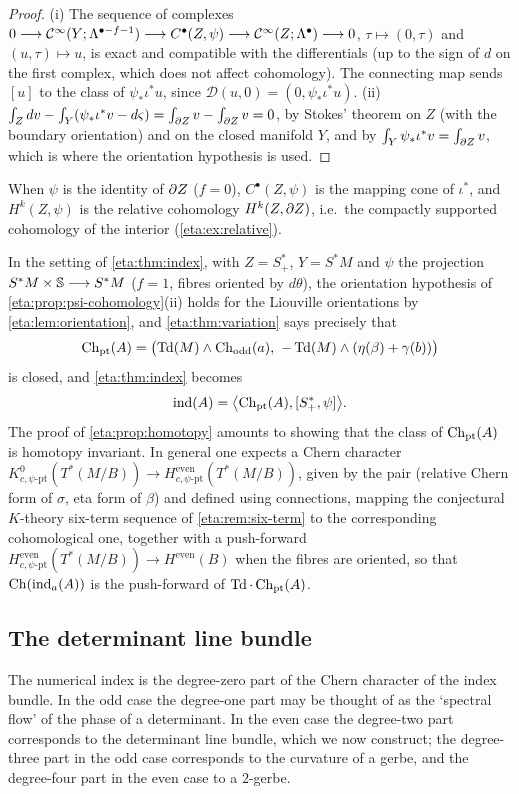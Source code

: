 \begin{proof} (i) The sequence of complexes $0\longrightarrow\mathcal{C}^\infty(Y;\Lambda^{\bullet-f-1})
\longrightarrow C^\bullet(Z,\psi)\longrightarrow\mathcal{C}^\infty(Z;\Lambda^\bullet)\longrightarrow0$,
$\tau\mapsto(0,\tau)$ and $(u,\tau)\mapsto u$, is exact and compatible with the
differentials (up to the sign of $d$ on the first complex, which does not affect
cohomology). The connecting map sends $[u]$ to the class of $\psi_*\iota^*u$, since
$\mathcal D(u,0)=(0,\psi_*\iota^*u)$. (ii) $\int_Zdv-\int_Y(\psi_*\iota^*v-d\varsigma)=
\int_{\partial Z}v-\int_{\partial Z}v=0$, by Stokes' theorem on $Z$ (with the boundary
orientation) and on the closed manifold $Y$, and by $\int_Y\psi_*\iota^*v=\int_{\partial Z}v$,
which is where the orientation hypothesis is used.
\end{proof}

When $\psi$ is the identity of $\partial Z$ ($f=0$), $C^\bullet(Z,\psi)$ is the mapping cone of
$\iota^*$, and $H^k(Z,\psi)$ is the relative cohomology $H^k(Z,\partial Z)$, i.e.\ the
compactly supported cohomology of the interior (\cref{eta:ex:relative}).

In the setting of \cref{eta:thm:index}, with $Z=S^*_+$, $Y=S^*M$ and $\psi$ the projection
$S^*M\times\mathbb{S}\longrightarrow S^*M$ ($f=1$, fibres oriented by $d\theta$), the
orientation hypothesis of \cref{eta:prop:psi-cohomology}(ii) holds for the Liouville
orientations by \cref{eta:lem:orientation}, and \cref{eta:thm:variation} says precisely that
\[
\Ch_{\mathrm{pt}}(A)=\bigl(\Td(M)\wedge\Chodd(a),\ -\Td(M)\wedge(\eta(\beta)+\gamma(b))\bigr)
\]
is closed, and \cref{eta:thm:index} becomes
\[
\operatorname{ind}(A)=\bigl\langle\operatorname{Ch}_{\mathrm{pt}}(A),[S^*_+,\psi]\bigr\rangle.
\]
The proof of \cref{eta:prop:homotopy} amounts to showing that the class of
$\operatorname{Ch}_{\mathrm{pt}}(A)$ is homotopy invariant. In general one expects a Chern character
$K^0_{c,\psi\text{-pt}}(T^*(M/B))\longrightarrow H^{\mathrm{even}}_{c,\psi\text{-pt}}(T^*(M/B))$,
given by the pair (relative Chern form of $\sigma$, eta form of $\beta$) and defined
using connections, mapping the conjectural $K$-theory six-term sequence of \cref{eta:rem:six-term}
to the corresponding cohomological one, together with a push-forward
$H^{\mathrm{even}}_{c,\psi\text{-pt}}(T^*(M/B))\longrightarrow H^{\mathrm{even}}(B)$ when the
fibres are oriented, so that $\operatorname{Ch}(\operatorname{ind}_a(A))$ is the push-forward of $\operatorname{Td}\cdot\operatorname{Ch}_{\mathrm{pt}}(A)$.

\subsection{The determinant line bundle}\label{eta:sec:determinant} The numerical index
is the degree-zero part of the Chern character of the index bundle. In the odd case the
degree-one part may be thought of as the `spectral flow' of the phase of a determinant.
In the even case the degree-two part corresponds to the determinant line bundle, which we
now construct; the degree-three part in the odd case corresponds to the curvature of a
gerbe, and the degree-four part in the even case to a $2$-gerbe.

